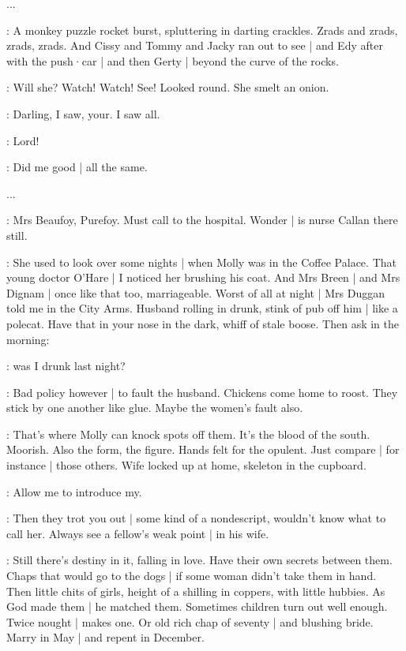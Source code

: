 ...

:
A monkey puzzle rocket burst,
spluttering in darting crackles.
Zrads and zrads,
zrads,
zrads.
And Cissy and Tommy and Jacky ran out to see |
and Edy after with the push·car |
and then Gerty |
beyond the curve of the rocks.

\BloomInt:
Will she?
Watch!
Watch!
See!
Looked round.
She smelt an onion.

\BloomAbstract:
Darling,
I saw,
your.
I saw all.

\BloomInt:
Lord!

\BloomCurrent:
Did me good |
all the same.

...

\BloomToday:
Mrs Beaufoy,
Purefoy.
Must call to the hospital.
Wonder |
is nurse Callan there still.%

\BloomHist:
She used to look over some nights |
when Molly was in the Coffee Palace.
That young doctor O'Hare |
I noticed her brushing his coat.
And Mrs Breen |
and Mrs Dignam |
once like that too,
marriageable.
Worst of all at night |
Mrs Duggan told me in the City Arms.
Husband rolling in drunk,
stink of pub off him |
like a polecat.
Have that in your nose in the dark,
whiff of stale boose.
Then ask in the morning:

\BloomOther:
was I drunk last night?

\BloomAbstract:
Bad policy however |
to fault the husband.
Chickens come home to roost.
They stick by one another like glue.
Maybe the women's fault also.

\BloomHist:
That's where Molly can knock spots off them.
It's the blood of the south.
Moorish.
Also the form,
the figure.
Hands felt for the opulent.
Just compare |
for instance |
those others.%
Wife locked up at home,
skeleton in the cupboard.

\BloomOther:
Allow me to introduce my.

\BloomHist:
Then they trot you out |
some kind of a nondescript,
wouldn't know what to call her.
Always see a fellow's weak point |
in his wife.

\BloomAbstract:
Still there's destiny in it,
falling in love.
Have their own secrets between them.
Chaps that would go to the dogs |
if some woman didn't take them in hand.
Then little chits of girls,
height of a shilling in coppers,
with little hubbies.
As God made them |
he matched them.
Sometimes children turn out well enough.
Twice nought | makes one.
Or old rich chap of seventy |
and blushing bride.
Marry in May |
and repent in December.

